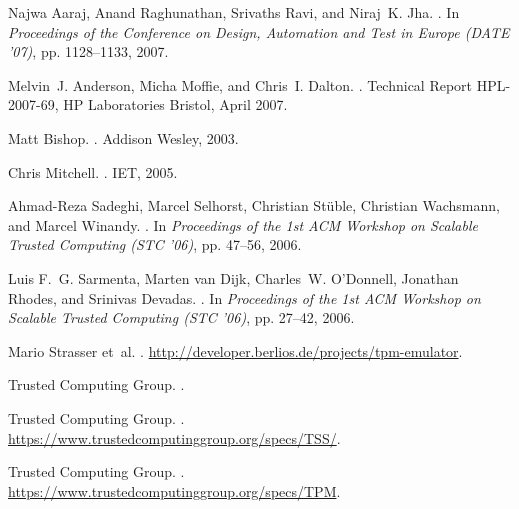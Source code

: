 \documentclass[runningheads]{llncs}
\begin{document}
\begin{thebibliography}{10}

Najwa Aaraj, Anand Raghunathan, Srivaths Ravi, and Niraj~K. Jha.
.
\newblock In {\em Proceedings of the Conference on Design, Automation and Test
  in Europe (DATE '07)}, pp. 1128--1133, 2007.

Melvin~J. Anderson, Micha Moffie, and Chris~I. Dalton.
.
\newblock Technical Report HPL-2007-69, HP Laboratories Bristol, April 2007.

Matt Bishop.
.
\newblock Addison Wesley, 2003.

Chris Mitchell.
.
\newblock IET, 2005.

Ahmad-Reza Sadeghi, Marcel Selhorst, Christian St\"{u}ble, Christian Wachsmann,
  and Marcel Winandy.
.
\newblock In {\em Proceedings of the 1st ACM Workshop on Scalable Trusted
  Computing (STC '06)}, pp. 47--56, 2006.

Luis F.~G. Sarmenta, Marten van Dijk, Charles~W. O'Donnell, Jonathan Rhodes,
  and Srinivas Devadas.
.
\newblock In {\em Proceedings of the 1st ACM Workshop on Scalable Trusted
  Computing (STC '06)}, pp. 27--42, 2006.

Mario Strasser et~al.
.
\newblock \newline\url{http://developer.berlios.de/projects/tpm-emulator}.

{Trusted Computing Group}.
.

{Trusted Computing Group}.
.
\newblock \newline\url{https://www.trustedcomputinggroup.org/specs/TSS/}.

{Trusted Computing Group}.
.
\newblock \newline\url{https://www.trustedcomputinggroup.org/specs/TPM}.


\end{thebibliography}
\end{document}
